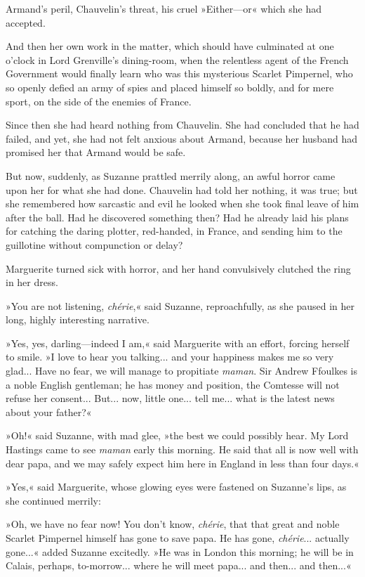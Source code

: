 Armand's peril, Chauvelin's threat, his cruel »Either\allowbreak---\allowbreak or\longdash« which she had accepted.

And then her own work in the matter, which should have culminated at one o'clock in Lord Grenville's dining-room, when the relentless agent of the French Government would finally learn who was this mysterious Scarlet Pimpernel, who so openly defied an army of spies and placed himself so boldly, and for mere sport, on the side of the enemies of France.

Since then she had heard nothing from Chauvelin. She had concluded that he had failed, and yet, she had not felt anxious about Armand, because her husband had promised her that Armand would be safe.

But now, suddenly, as Suzanne prattled merrily along, an awful horror came upon her for what she had done. Chauvelin had told her nothing, it was true; but she remembered how sarcastic and evil he looked when she took final leave of him after the ball. Had he discovered something then? Had he already laid his plans for catching the daring plotter, red-handed, in France, and sending him to the guillotine without compunction or delay?

Marguerite turned sick with horror, and her hand convulsively clutched the ring in her dress.

»You are not listening, \textit{chérie},« said Suzanne, reproachfully, as she paused in her long, highly interesting narrative.

»Yes, yes, darling\allowbreak---\allowbreak indeed I am,« said Marguerite with an effort, forcing herself to smile. »I love to hear you talking... and your happiness makes me so very glad... Have no fear, we will manage to propitiate \textit{maman}. Sir Andrew Ffoulkes is a noble English gentleman; he has money and position, the Comtesse will not refuse her consent... But... now, little one... tell me... what is the latest news about your father?«

»Oh!« said Suzanne, with mad glee, »the best we could possibly hear. My Lord Hastings came to see \textit{maman} early this morning. He said that all is now well with dear papa, and we may safely expect him here in England in less than four days.«

»Yes,« said Marguerite, whose glowing eyes were fastened on Suzanne's lips, as she continued merrily:

»Oh, we have no fear now! You don't know, \textit{chérie}, that that great and noble Scarlet Pimpernel himself has gone to save papa. He has gone, \textit{chérie}... actually gone...« added Suzanne excitedly. »He was in London this morning; he will be in Calais, perhaps, to-morrow... where he will meet papa... and then... and then...«

